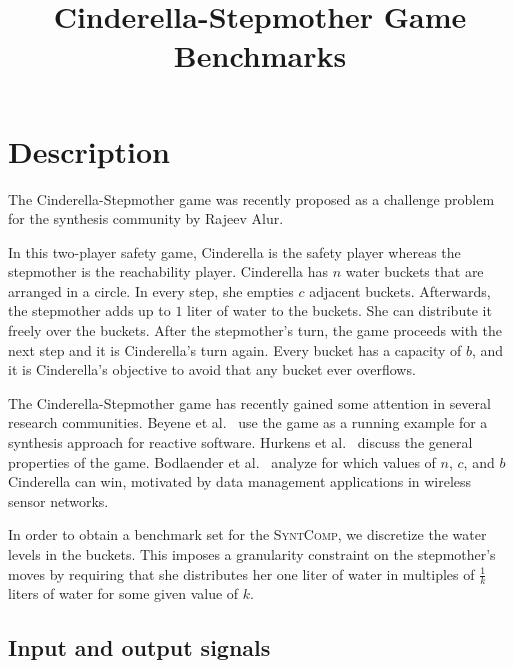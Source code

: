 \documentclass[a4paper,conference,10pt]{IEEEtran}
\author{\IEEEauthorblockN{R\"udiger Ehlers}
\IEEEauthorblockA{University of Bremen \& DFKI GmbH\\
Germany
}}
\newcommand{\SyntComp}{\textsc{SyntComp}}
\begin{document}
\title{Cinderella-Stepmother Game Benchmarks}
\maketitle

\section{Description}

\noindent The Cinderella-Stepmother game was recently proposed as a challenge problem for the synthesis community by Rajeev Alur. 

In this two-player safety game, Cinderella is the safety player whereas the stepmother is the reachability player. Cinderella has $n$ water buckets that are arranged in a circle. In every step, she empties $c$ adjacent buckets. Afterwards, the stepmother adds up to $1$ liter of water to the buckets. She can distribute it freely over the buckets. After the stepmother's turn, the game proceeds with the next step and it is Cinderella's turn again. 
Every bucket has a capacity of $b$, and it is Cinderella's objective to avoid that any bucket ever overflows.

The Cinderella-Stepmother game has recently gained some attention in several research communities.
Beyene et al.~\cite{DBLP:conf/popl/BeyeneCPR14} use the game as a running example for a synthesis approach for reactive software.
Hurkens et al.~\cite{Hurkens2011} discuss the general properties of the game.
Bodlaender et al.~\cite{DBLP:conf/ifipTCS/BodlaenderHKSWZ12} analyze for which values of $n$, $c$, and $b$ Cinderella can win, motivated by data management applications in wireless sensor networks.

In order to obtain a benchmark set for the \SyntComp, we discretize the water levels in the buckets. This imposes  a granularity constraint on the stepmother's moves by requiring that she distributes her one liter of water in multiples of $\frac{1}{k}$ liters of water for some given value of $k$.

\subsection{Input and output signals}
\end{document}
